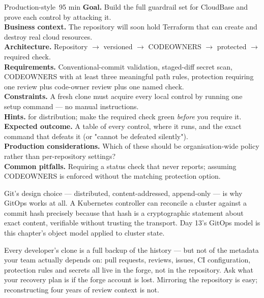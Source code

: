 \begin{minilab}{Production-style}{~95 min}
\textbf{Goal.} Build the full guardrail set for CloudBase and prove each control by attacking it.\\
\textbf{Business context.} The repository will soon hold Terraform that can create and destroy real cloud resources.\\
\textbf{Architecture.} Repository $\rightarrow$ versioned  $\rightarrow$ CODEOWNERS $\rightarrow$ protected  $\rightarrow$ required check.\\
\textbf{Requirements.} Conventional-commit validation, staged-diff secret scan, CODEOWNERS with at least three meaningful path rules, protection requiring one review plus code-owner review plus one named check.\\
\textbf{Constraints.} A fresh clone must acquire every local control by running one setup command --- no manual instructions.\\
\textbf{Hints.}  for distribution; make the required check green \emph{before} you require it.\\
\textbf{Expected outcome.} A table of every control, where it runs, and the exact command that defeats it (or "cannot be defeated silently").\\
\textbf{Production considerations.} Which of these should be organisation-wide policy rather than per-repository settings?\\
\textbf{Common pitfalls.} Requiring a status check that never reports; assuming CODEOWNERS is enforced without the matching protection option.
\end{minilab}


\begin{infranote}
Git's design choice --- distributed, content-addressed, append-only --- is why GitOps works at all. A Kubernetes controller can reconcile a cluster against a commit hash precisely because that hash is a cryptographic statement about exact content, verifiable without trusting the transport. Day 13's GitOps model is this chapter's object model applied to cluster state.
\end{infranote}

\begin{drtip}
Every developer's clone is a full backup of the history --- but not of the metadata your team actually depends on: pull requests, reviews, issues, CI configuration, protection rules and secrets all live in the forge, not in the repository. Ask what your recovery plan is if the forge account is lost. Mirroring the repository is easy; reconstructing four years of review context is not.
\end{drtip}

